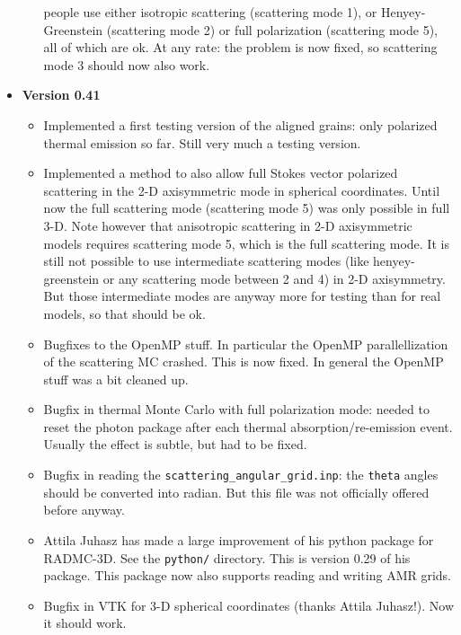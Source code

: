 \documentclass{report}
\begin{document}
\begin{itemize}
\begin{itemize}
    people use either isotropic scattering (scattering mode 1), or
    Henyey-Greenstein (scattering mode 2) or full polarization (scattering
    mode 5), all of which are ok. At any rate: the problem is now fixed,
    so scattering mode 3 should now also work.
  \end{itemize}
\item {\bf Version 0.41}\\
  \begin{itemize}
    \item Implemented a first testing version of the aligned grains:
      only polarized thermal emission so far. Still very much a testing
      version.
    \item Implemented a method to also allow full Stokes vector polarized
      scattering in the 2-D axisymmetric mode in spherical
      coordinates. Until now the full scattering mode (scattering mode 5)
      was only possible in full 3-D. Note however that anisotropic
      scattering in 2-D axisymmetric models requires scattering mode 5,
      which is the full scattering mode.  It is still not possible to use
      intermediate scattering modes (like henyey-greenstein or any
      scattering mode between 2 and 4) in 2-D axisymmetry. But those
      intermediate modes are anyway more for testing than for real models,
      so that should be ok.
    \item Bugfixes to the OpenMP stuff. In particular the OpenMP 
      parallellization of the scattering MC crashed. This is now fixed.
      In general the OpenMP stuff was a bit cleaned up.
    \item Bugfix in thermal Monte Carlo with full polarization mode: needed
      to reset the photon package after each thermal absorption/re-emission
      event. Usually the effect is subtle, but had to be fixed.
    \item Bugfix in reading the {\small\tt scattering\_angular\_grid.inp}:
      the {\small\tt theta} angles should be converted into radian. But
      this file was not officially offered before anyway. 
    \item Attila Juhasz has made a large improvement of his python package
      for RADMC-3D. See the {\small\tt python/} directory. This is version
      0.29 of his package. This package now also supports reading and
      writing AMR grids.
    \item Bugfix in VTK for 3-D spherical coordinates (thanks Attila Juhasz!).
      Now it should work.
  \end{itemize}
\end{itemize}
\end{document}
